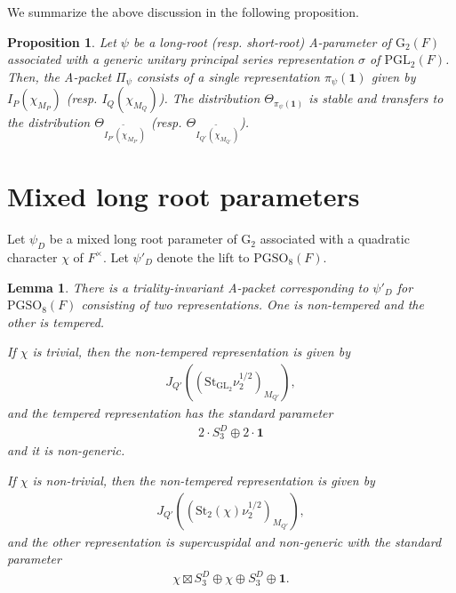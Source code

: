 \documentclass[12pt]{amsart}
\theoremstyle{definition}
\theoremstyle{plain}
\newtheorem{proposition}[definition]{Proposition}
\newtheorem{lemma}[definition]{Lemma}
\theoremstyle{remark}
\def\GL{\mathrm{GL}}
\def\PGL{\mathrm{PGL}}
\def\PGSO{\mathrm{PGSO}}
\numberwithin{equation}{section}
\newcommand{\rG}{\mathrm{G}}
\newcommand{\St}{\mathrm{St}}
\begin{document}
We summarize the above discussion in the following proposition.
\begin{proposition}\label{prop:co-tempered-long-short-unbounded-ecr}
      Let $\psi$ be a long-root (resp. short-root) A-parameter of $\rG_2(F)$ associated with a generic unitary principal series representation $\sigma$ of $\PGL_2(F)$.
      Then, the A-packet $\Pi_{\psi}$ consists of a single representation $\pi_{\psi}(\mathbf{1})$ given by $I_P(\chi_{M_P})$ (resp. $I_Q(\chi_{M_Q})$).
      The distribution $\Theta_{\pi_{\psi}(\mathbf{1})}$ is stable and transfers to the distribution $\Theta_{\widetilde{I_{P'}(\chi_{M_{P'}})}}$ (resp. $\Theta_{\widetilde{I_{Q'}(\chi_{M_{Q'}})}}$).
\end{proposition}


\section{Mixed long root parameters}\label{sec:mixed-long}

Let $\psi_D$ be a mixed long root parameter of ${\rG_2}$ associated with a quadratic character $\chi$ of $F^{\times}$.
Let $\psi'_D$ denote the lift to $\PGSO_8(F)$.


\begin{lemma}  
      There is a triality-invariant A-packet corresponding to $\psi'_D$ for $\PGSO_8(F)$ consisting of two representations.
      One is non-tempered and the other is tempered.

      If $\chi$ is trivial, then the non-tempered representation is given by
      \begin{align*}
            J_{Q'}((\St_{\GL_2} \nu_2^{1/2})_{M_{Q'}}),
      \end{align*}
      and the tempered representation has the standard parameter
      \begin{align*}
            2 \cdot S_3^D \oplus 2 \cdot \mathbf{1}
      \end{align*}
      and it is non-generic.

      If $\chi$ is non-trivial, then the non-tempered representation is given by
      \begin{align*}
            J_{Q'}((\St_{2}(\chi) \nu_2^{1/2})_{M_{Q'}}),
      \end{align*}
      and the other representation is supercuspidal and non-generic with the standard parameter 
      \begin{align*}
            \chi \boxtimes S_3^D \oplus \chi \oplus S_3^D \oplus \mathbf{1}.
      \end{align*}
\end{lemma}
\end{document}
